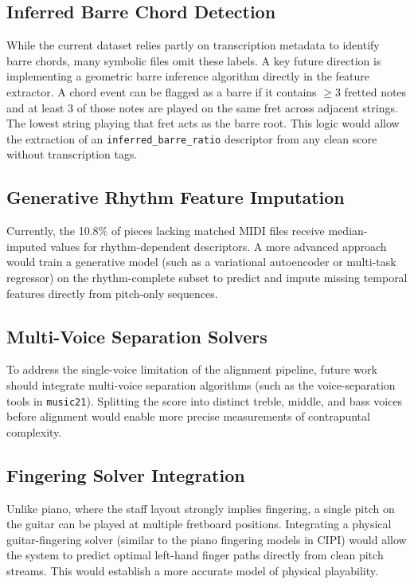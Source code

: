 \subsection{Inferred Barre Chord Detection}
While the current dataset relies partly on transcription metadata to identify barre chords, many symbolic files omit these labels. A key future direction is implementing a geometric barre inference algorithm directly in the feature extractor. A chord event can be flagged as a barre if it contains $\ge 3$ fretted notes and at least 3 of those notes are played on the same fret across adjacent strings. The lowest string playing that fret acts as the barre root. This logic would allow the extraction of an \texttt{inferred\_barre\_ratio} descriptor from any clean score without transcription tags.

\subsection{Generative Rhythm Feature Imputation}
Currently, the 10.8\% of pieces lacking matched MIDI files receive median-imputed values for rhythm-dependent descriptors. A more advanced approach would train a generative model (such as a variational autoencoder or multi-task regressor) on the rhythm-complete subset to predict and impute missing temporal features directly from pitch-only sequences.

\subsection{Multi-Voice Separation Solvers}
To address the single-voice limitation of the alignment pipeline, future work should integrate multi-voice separation algorithms (such as the voice-separation tools in \texttt{music21}). Splitting the score into distinct treble, middle, and bass voices before alignment would enable more precise measurements of contrapuntal complexity.

\subsection{Fingering Solver Integration}
Unlike piano, where the staff layout strongly implies fingering, a single pitch on the guitar can be played at multiple fretboard positions. Integrating a physical guitar-fingering solver (similar to the piano fingering models in CIPI) would allow the system to predict optimal left-hand finger paths directly from clean pitch streams. This would establish a more accurate model of physical playability.
